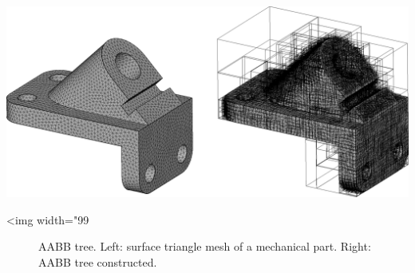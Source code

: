 \begin{center}
    \label{fig:AABB-tree-anchor}
    \begin{ccTexOnly}
      \includegraphics[width=1.0\textwidth]{AABB_tree/anchor}
    \end{ccTexOnly}
    \begin{ccHtmlOnly}
        <img width="99%
    \end{ccHtmlOnly}
    \begin{figure}[h]
        \caption{AABB tree.
                 Left: surface triangle mesh of a mechanical part.
                 Right: AABB tree constructed.}
    \end{figure}
\end{center}
